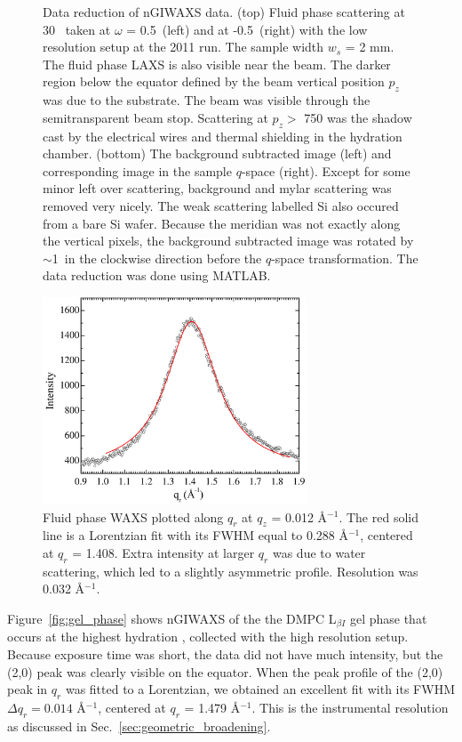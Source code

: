 \begin{figure}[htbp]
  {Data reduction of nGIWAXS data. (top) Fluid phase scattering at
  30 \textcelsius\ taken at $\omega$ = 0.5\textdegree\ (left) 
  and at -0.5\textdegree\ (right) with the low resolution setup at the 
  2011 run. The sample width $w_s$ = 2 mm.
  The fluid phase LAXS is also visible near the beam.  
  The darker region below the equator defined by 
  the beam vertical position $p_z$ was due to the substrate. The beam
  was visible through the semitransparent beam stop.
  Scattering at $p_z >$ 750 was the shadow cast by the electrical wires 
  and thermal shielding in the hydration chamber.
  (bottom) The background subtracted 
  image (left) and corresponding image in the sample $q$-space (right).
  Except for some minor left over scattering, background and mylar scattering was 
  removed very nicely. The weak scattering labelled Si also occured from a bare Si wafer.  
  Because the meridian was not exactly along the vertical
  pixels, the background subtracted image was rotated by $\sim$1\textdegree\
  in the clockwise direction before the $q$-space transformation. The data
  reduction was done using MATLAB.}
  \label{fig:waxs_data_reduction}
\end{figure}

\begin{figure}[htbp]
  \centering
  \includegraphics[width=0.7\textwidth]{figures/ripple/nGIWAXS/fluid_qr}
  \caption{Fluid phase WAXS plotted along $q_r$ at $q_z$ = 0.012 \AA$^{-1}$.
  The red solid line is a Lorentzian fit with its FWHM equal to 0.288 \AA$^{-1}$,
  centered at $q_r$ = 1.408. Extra intensity at larger $q_r$ was due to
  water scattering, which led to a slightly asymmetric profile.  
  Resolution was 0.032 \AA$^{-1}$.}
  \label{fig:fluid_qr}
\end{figure}

Figure~\ref{fig:gel_phase} shows nGIWAXS of the the DMPC L$_{\beta I}$ gel phase
that occurs at the highest hydration \cite{ref:Smith88,Tristram-Nagle02},
collected with the high resolution setup. Because exposure time was short,
the data did not have much intensity, but the (2,0) peak was clearly 
visible on the equator.
When the peak profile of the (2,0) peak in $q_r$ was fitted to a Lorentzian, 
we obtained an excellent fit with its FWHM $\Delta q_r = 0.014$ \AA$^{-1}$,
centered at $q_r$ = 1.479 \AA$^{-1}$.
This is the instrumental resolution as discussed in Sec.~\ref{sec:geometric_broadening}. 

